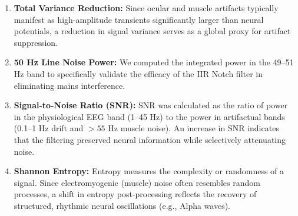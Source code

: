 \documentclass[11pt,a4paper]{article}
\begin{document}
\begin{enumerate}
    \item \textbf{Total Variance Reduction:} 
    Since ocular and muscle artifacts typically manifest as high-amplitude transients significantly larger than neural potentials, a reduction 
    in signal variance serves as a global proxy for artifact suppression.
    
    \item \textbf{50 Hz Line Noise Power:} 
    We computed the integrated power in the 49--51 Hz band to specifically validate the efficacy of the IIR Notch filter in eliminating mains 
    interference.
    
    \item \textbf{Signal-to-Noise Ratio (SNR):} 
    SNR was calculated as the ratio of power in the physiological EEG band (1--45 Hz) to the power in artifactual bands (0.1--1 Hz drift and 
    $>55$ Hz muscle noise). An increase in SNR indicates that the filtering preserved neural information while selectively attenuating noise.
    
    \item \textbf{Shannon Entropy:} 
    Entropy measures the complexity or randomness of a signal. Since electromyogenic (muscle) noise often resembles random processes, a shift 
    in entropy post-processing reflects the recovery of structured, rhythmic neural oscillations (e.g., Alpha waves).
\end{enumerate}

\begin{table}[H]
    \centering
    \caption{Quantitative Assessment of Preprocessing Efficacy}
    \label{tab:quantitative}
\end{table}
\end{document}
